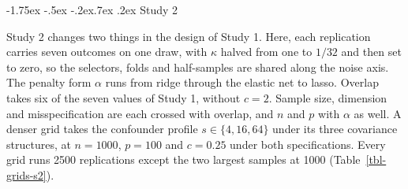 \documentclass[
  12pt,
  a4paper,
]{article}
\makeatletter
\renewcommand\subsubsection{\@startsection{subsubsection}{3}{\z@}%
  {-1.75ex \@plus -.5ex \@minus -.2ex}{.7ex \@plus .2ex}%
  {\normalfont\normalsize\bfseries}}
\makeatother
\begin{document}
\subsubsection{Study 2}\label{study-2-1}

Study 2 changes two things in the design of Study 1. Here, each
replication carries seven outcomes on one draw, with \(\kappa\) halved
from one to \(1/32\) and then set to zero, so the selectors, folds and
half-samples are shared along the noise axis. The penalty form
\(\alpha\) runs from ridge through the elastic net to lasso. Overlap
takes six of the seven values of Study 1, without \(c = 2\). Sample
size, dimension and misspecification are each crossed with overlap, and
\(n\) and \(p\) with \(\alpha\) as well. A denser grid takes the
confounder profile \(s \in \{4, 16, 64\}\) under its three covariance
structures, at \(n = 1000\), \(p = 100\) and \(c = 0.25\) under both
specifications. Every grid runs 2500 replications except the two largest
samples at 1000 (Table~\ref{tbl-grids-s2}).
\end{document}
